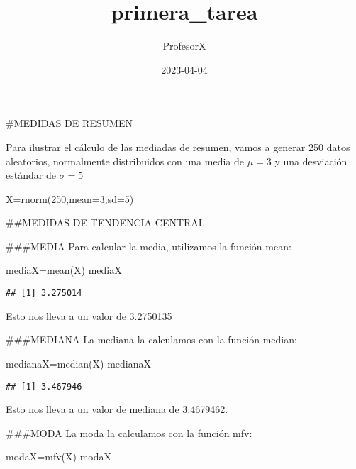 \documentclass[
]{article}
\title{primera\_tarea}
\author{ProfesorX}
\date{2023-04-04}
\newenvironment{Shaded}{\begin{snugshade}}{\end{snugshade}}
\newcommand{\AttributeTok}[1]{\textcolor[rgb]{0.77,0.63,0.00}{#1}}
\newcommand{\DecValTok}[1]{\textcolor[rgb]{0.00,0.00,0.81}{#1}}
\newcommand{\FunctionTok}[1]{\textcolor[rgb]{0.00,0.00,0.00}{#1}}
\newcommand{\NormalTok}[1]{#1}
\newcommand{\OtherTok}[1]{\textcolor[rgb]{0.56,0.35,0.01}{#1}}
\begin{document}
\maketitle

\#MEDIDAS DE RESUMEN

Para ilustrar el cálculo de las mediadas de resumen, vamos a generar 250
datos aleatorios, normalmente distribuidos con una media de \(\mu=3\) y
una desviación estándar de \(\sigma=5\)

\begin{Shaded}
\begin{Highlighting}[]
\NormalTok{X}\OtherTok{=}\FunctionTok{rnorm}\NormalTok{(}\DecValTok{250}\NormalTok{,}\AttributeTok{mean=}\DecValTok{3}\NormalTok{,}\AttributeTok{sd=}\DecValTok{5}\NormalTok{)}
\end{Highlighting}
\end{Shaded}

\#\#MEDIDAS DE TENDENCIA CENTRAL

\#\#\#MEDIA Para calcular la media, utilizamos la función mean:

\begin{Shaded}
\begin{Highlighting}[]
\NormalTok{mediaX}\OtherTok{=}\FunctionTok{mean}\NormalTok{(X)}
\NormalTok{mediaX}
\end{Highlighting}
\end{Shaded}

\begin{verbatim}
## [1] 3.275014
\end{verbatim}

Esto nos lleva a un valor de 3.2750135

\#\#\#MEDIANA La mediana la calculamos con la función median:

\begin{Shaded}
\begin{Highlighting}[]
\NormalTok{medianaX}\OtherTok{=}\FunctionTok{median}\NormalTok{(X)}
\NormalTok{medianaX}
\end{Highlighting}
\end{Shaded}

\begin{verbatim}
## [1] 3.467946
\end{verbatim}

Esto nos lleva a un valor de mediana de 3.4679462.

\#\#\#MODA La moda la calculamos con la función mfv:

\begin{Shaded}
\begin{Highlighting}[]
\NormalTok{modaX}\OtherTok{=}\FunctionTok{mfv}\NormalTok{(X)}
\NormalTok{modaX}
\end{Highlighting}
\end{Shaded}
\end{document}
